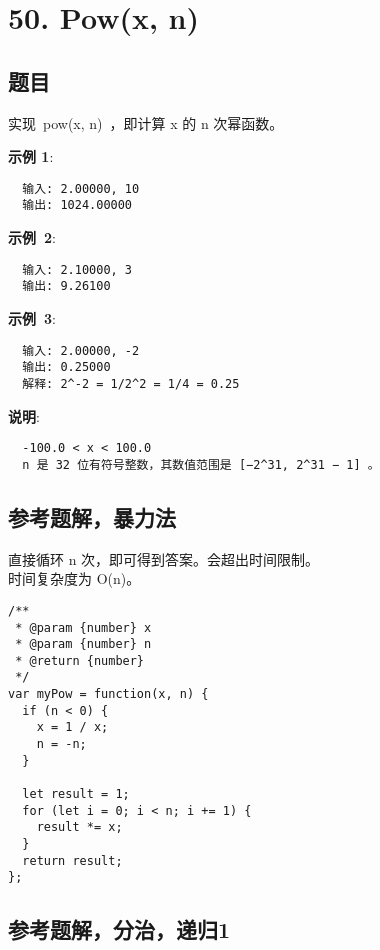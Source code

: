 \newpage
\section{50. Pow(x, n)}
\label{leetcode:50}

\subsection{题目}

实现 pow(x, n) ，即计算 x 的 n 次幂函数。

\textbf{示例 1}:

\begin{verbatim}
  输入: 2.00000, 10
  输出: 1024.00000
\end{verbatim}

\textbf{示例 2}:

\begin{verbatim}
  输入: 2.10000, 3
  输出: 9.26100
\end{verbatim}

\textbf{示例 3}:

\begin{verbatim}
  输入: 2.00000, -2
  输出: 0.25000
  解释: 2^-2 = 1/2^2 = 1/4 = 0.25
\end{verbatim}

\textbf{说明}:

\begin{verbatim}
  -100.0 < x < 100.0
  n 是 32 位有符号整数，其数值范围是 [−2^31, 2^31 − 1] 。
\end{verbatim}

\subsection{参考题解，暴力法}

直接循环 n 次，即可得到答案。会超出时间限制。\\
时间复杂度为 O(n)。

\begin{verbatim}
/**
 * @param {number} x
 * @param {number} n
 * @return {number}
 */
var myPow = function(x, n) {
  if (n < 0) {
    x = 1 / x;
    n = -n;
  }

  let result = 1;
  for (let i = 0; i < n; i += 1) {
    result *= x;
  }
  return result;
};
\end{verbatim}

\subsection{参考题解，分治，递归1}

